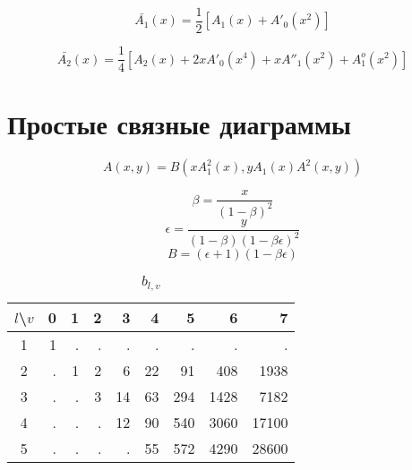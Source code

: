 \documentclass[12pt]{article}
\begin{document}
\begin{equation}
\bar{A_1}(x) = \frac{1}{2} \left[ A_1(x) + A'_0(x^2) \right]
\end{equation}

\begin{equation}
\bar{A_2}(x) = \frac{1}{4} \left[ A_2(x) + 2 x A'_0(x^4) + x A''_1(x^2) + A^o_1(x^2) \right]
\end{equation}

\section{Простые связные диаграммы}

\begin{equation}
A(x, y) = B(x A_1^2(x), y A_1(x) A^2(x, y))
\end{equation}

\begin{equation}
\beta = \frac{x}{(1 - \beta)^2}
\end{equation}
\begin{equation}
\epsilon = \frac{y}{(1 - \beta) (1 - \beta \epsilon)^2}
\end{equation}
\begin{equation}
B = (\epsilon + 1) (1 - \beta \epsilon)
\end{equation}

\begin{table}[H!]
	\center
	\caption{$b_{l,v}$}
	\begin{tabular}{|c||r|r|r|r|r|r|r|r|}
	\hline
	$l$\textbackslash $v$
	  & 0 & 1 & 2 &  3 &  4 &   5 &    6 &     7 \\
	\hline\hline
	1 & 1 & . & . &  . &  . &   . &    . &     . \\
	2 & . & 1 & 2 &  6 & 22 &  91 &  408 &  1938 \\
	3 & . & . & 3 & 14 & 63 & 294 & 1428 &  7182 \\
	4 & . & . & . & 12 & 90 & 540 & 3060 & 17100 \\
	5 & . & . & . &  . & 55 & 572 & 4290 & 28600 \\
	\hline
	\end{tabular}
\end{table}
\end{document}

